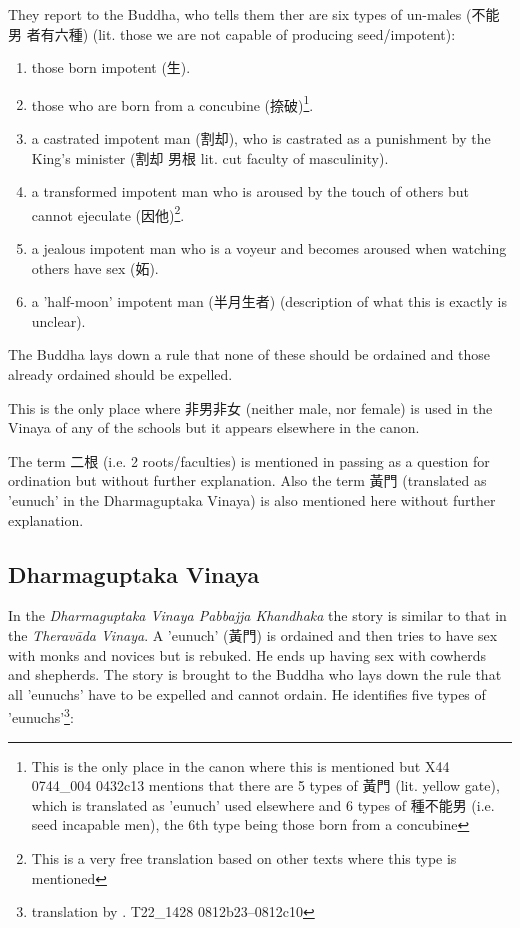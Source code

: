They report to the Buddha, who tells them ther are six types of un-males (不能男 者有六種) (lit. those we are not capable of producing seed/impotent):
\begin{enumerate}
\item those born impotent (生). 
\item those who are born from a concubine (捺破)\footnote{This is the only place in the canon where this is mentioned but X44 0744_004 0432c13 mentions that there are 5 types of 黃門 (lit. yellow gate), which is translated as 'eunuch' used elsewhere and 6 types of 種不能男 (i.e. seed incapable men), the 6th type being those born from a concubine}.
\item a castrated impotent man (割却), who is castrated as a punishment by the King's minister (割却 男根 lit. cut faculty of masculinity).
\item a transformed impotent man who is aroused by the touch of others but cannot ejeculate (因他)\footnote{This is a very free translation based on other texts where this type is mentioned}.
\item a jealous impotent man who is a voyeur and becomes aroused when watching others have sex (妬).
\item a 'half-moon' impotent man (半月生者) (description of what this is exactly is unclear).
\end{enumerate}

The Buddha lays down a rule that none of these should be ordained and those already ordained should be expelled.

This is the only place where 非男非女 (neither male, nor female) is used in the Vinaya of any of the schools but it appears elsewhere in the canon.

The term 二根 (i.e. 2 roots/faculties) is mentioned in passing as a question for ordination but without further explanation. Also the term 黃門 (translated as 'eunuch' in the Dharmaguptaka Vinaya) is also mentioned here without further explanation.


\subsection{Dharmaguptaka Vinaya}
In the {\em Dharmaguptaka Vinaya Pabbajja Khandhaka} the story is similar to that in the {\em Theravāda Vinaya}. A 'eunuch' (黃門) is ordained and then tries to have sex with monks and novices but is rebuked. He ends up having sex with cowherds and shepherds. The story is brought to the Buddha who lays down the rule that all 'eunuchs' have to be expelled and cannot ordain. He identifies five types of 'eunuchs'\footnote{translation by \cite{bodhi}. T22_1428 0812b23–0812c10}: 

